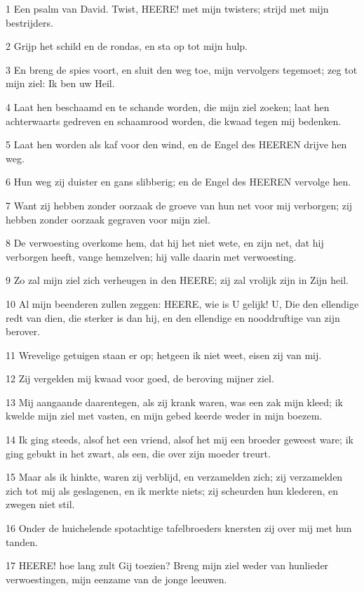 \par 1 Een psalm van David. Twist, HEERE! met mijn twisters; strijd met mijn bestrijders.
\par 2 Grijp het schild en de rondas, en sta op tot mijn hulp.
\par 3 En breng de spies voort, en sluit den weg toe, mijn vervolgers tegemoet; zeg tot mijn ziel: Ik ben uw Heil.
\par 4 Laat hen beschaamd en te schande worden, die mijn ziel zoeken; laat hen achterwaarts gedreven en schaamrood worden, die kwaad tegen mij bedenken.
\par 5 Laat hen worden als kaf voor den wind, en de Engel des HEEREN drijve hen weg.
\par 6 Hun weg zij duister en gans slibberig; en de Engel des HEEREN vervolge hen.
\par 7 Want zij hebben zonder oorzaak de groeve van hun net voor mij verborgen; zij hebben zonder oorzaak gegraven voor mijn ziel.
\par 8 De verwoesting overkome hem, dat hij het niet wete, en zijn net, dat hij verborgen heeft, vange hemzelven; hij valle daarin met verwoesting.
\par 9 Zo zal mijn ziel zich verheugen in den HEERE; zij zal vrolijk zijn in Zijn heil.
\par 10 Al mijn beenderen zullen zeggen: HEERE, wie is U gelijk! U, Die den ellendige redt van dien, die sterker is dan hij, en den ellendige en nooddruftige van zijn berover.
\par 11 Wrevelige getuigen staan er op; hetgeen ik niet weet, eisen zij van mij.
\par 12 Zij vergelden mij kwaad voor goed, de beroving mijner ziel.
\par 13 Mij aangaande daarentegen, als zij krank waren, was een zak mijn kleed; ik kwelde mijn ziel met vasten, en mijn gebed keerde weder in mijn boezem.
\par 14 Ik ging steeds, alsof het een vriend, alsof het mij een broeder geweest ware; ik ging gebukt in het zwart, als een, die over zijn moeder treurt.
\par 15 Maar als ik hinkte, waren zij verblijd, en verzamelden zich; zij verzamelden zich tot mij als geslagenen, en ik merkte niets; zij scheurden hun klederen, en zwegen niet stil.
\par 16 Onder de huichelende spotachtige tafelbroeders knersten zij over mij met hun tanden.
\par 17 HEERE! hoe lang zult Gij toezien? Breng mijn ziel weder van hunlieder verwoestingen, mijn eenzame van de jonge leeuwen.
